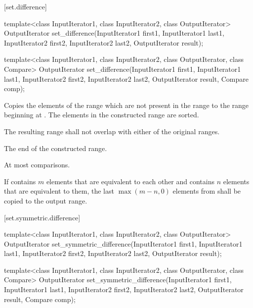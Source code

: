 [set.difference]{}

%
\begin{itemdecl}
template<class InputIterator1, class InputIterator2,
         class OutputIterator>
  OutputIterator
    set_difference(InputIterator1 first1, InputIterator1 last1,
                   InputIterator2 first2, InputIterator2 last2,
                   OutputIterator result);

template<class InputIterator1, class InputIterator2,
         class OutputIterator, class Compare>
  OutputIterator
    set_difference(InputIterator1 first1, InputIterator1 last1,
                   InputIterator2 first2, InputIterator2 last2,
                   OutputIterator result, Compare comp);
\end{itemdecl}

\begin{itemdescr}
\pnum
\effects
Copies the elements of the range
which are not present in the range
to the range beginning at
.
The elements in the constructed range are sorted.

\pnum
\requires
The resulting range shall not overlap with either of the original ranges.

\pnum
\returns
The end of the constructed range.

\pnum
\complexity
At most
comparisons.

\pnum
\notes
If
contains $m$
elements that are equivalent to each other and
contains $n$
elements that are equivalent to them, the last
$\max(m - n, 0)$
elements from
shall be copied to the output range.
\end{itemdescr}

[set.symmetric.difference]{}

%
\begin{itemdecl}
template<class InputIterator1, class InputIterator2,
         class OutputIterator>
  OutputIterator
    set_symmetric_difference(InputIterator1 first1, InputIterator1 last1,
                             InputIterator2 first2, InputIterator2 last2,
                             OutputIterator result);

template<class InputIterator1, class InputIterator2,
         class OutputIterator, class Compare>
  OutputIterator
    set_symmetric_difference(InputIterator1 first1, InputIterator1 last1,
                             InputIterator2 first2, InputIterator2 last2,
                             OutputIterator result, Compare comp);
\end{itemdecl}

